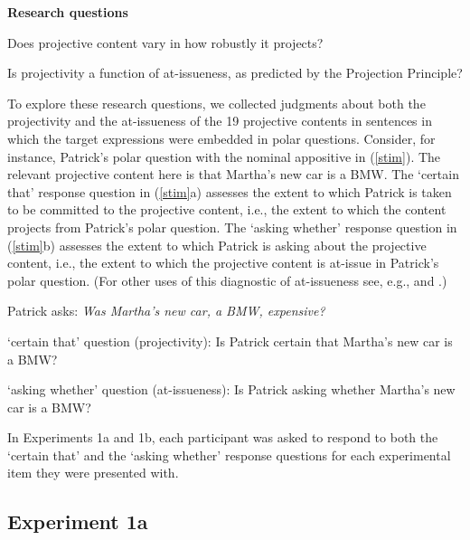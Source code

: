 \documentclass[11pt,fleqn]{article}
\newcommand{\6}{\mbox{$[\hspace*{-.6mm}[$}}
\newcommand{\9}{\mbox{$]\hspace*{-.6mm}]$}}
\begin{document}
\begin{exe}
\ex\label{questions} {\bf Research questions}

\begin{xlist} 

\ex Does projective content vary in how robustly it projects?

\ex Is projectivity a function of at-issueness, as predicted by the Projection Principle?
\end{xlist}

\end{exe} 
To explore these research questions, we collected judgments about both the projectivity and the at-issueness of the 19 projective contents in sentences in which the target expressions were embedded in polar questions. Consider, for instance, Patrick's polar question with the nominal appositive in (\ref{stim}). The relevant projective content here is that Martha's new car is a BMW. The `certain that' response question in (\ref{stim}a) assesses the extent to which Patrick is taken to be committed to the projective content, i.e., the extent to which the content projects from Patrick's polar question. The `asking whether' response question in (\ref{stim}b) assesses the extent to which Patrick is asking about the projective content, i.e., the extent to which the projective content is at-issue in Patrick's polar question. (For other uses of this diagnostic of at-issueness see, e.g., \citealt{amaral-etal07} and \citealt{tonhauser-sula6}.)

\begin{exe}

\ex\label{stim} Patrick asks: {\em Was Martha's new car, a BMW, expensive?} 

\begin{xlist}
\ex `certain that' question (projectivity): Is Patrick certain that Martha's new car is a BMW?

\ex `asking whether' question (at-issueness): Is Patrick asking whether Martha's new car is a BMW?

\end{xlist}

\end{exe}
In Experiments 1a and 1b, each participant was asked to respond to both the `certain that'  and the `asking whether' response questions for each experimental item they were presented with.

\subsection{Experiment 1a}\label{s-exp1a}
\end{document}
